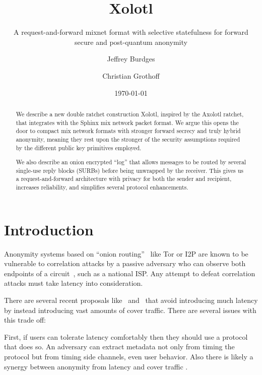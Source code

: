 \documentclass[twoside,letterpaper]{llncs}
\title{Xolotl}
\subtitle{A request-and-forward mixnet format with selective statefulness for forward secure and post-quantum anonymity}
\author{Jeffrey Burdges \and Christian Grothoff}
\date{\today}
\institute{Inria}
\begin{document}
\maketitle



\begin{abstract}
We describe a new double ratchet construction Xolotl, inspired by the
Axolotl ratchet, that integrates with the Sphinx mix network packet
format.  We argue this opens the door to compact mix network formats
with stronger forward secrecy and truly hybrid anonymity, meaning they
rest upon the stronger of the security assumptions required by the
different public key primitives employed.

We also describe an onion encrypted ``log'' that allows messages to
be routed by several single-use reply blocks (SURBs) before being
unwrapped by the receiver.  This gives us a request-and-forward
architecture with privacy for both the sender and recipient,
increases reliability, and simplifies several protocol enhancements.
\end{abstract}


\section{Introduction}

Anonymity systems based on ``onion routing''~\cite{SS03} like Tor or
I2P are known to be vulnerable to correlation attacks by a passive
adversary who can observe both endpoints of a
circuit~\cite{timing-fc2004}, such as a national ISP.  Any attempt to
defeat correlation attacks must take latency into consideration.

There are several recent proposals like~\cite{Alpenhorn}
and~\cite{Dissent} that avoid introducing much latency by instead
introducing vast amounts of cover traffic.  There are several issues
with this trade off:  

First, if users can tolerate latency comfortably then they should
use a protocol that does so.  An adversary can extract metadata not
only from timing the protocol but from timing side channels, even
user behavior.  Also there is likely a synergy between anonymity from
latency and cover traffic \cite{??}.
\end{document}
